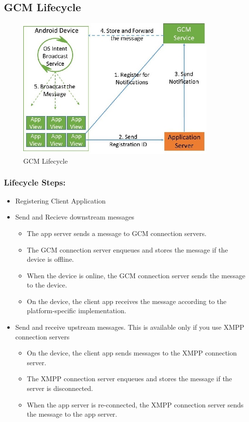 \subsection{GCM Lifecycle}
\begin{figure}[h]
\centering
\includegraphics[width=10cm]{images/Steps.jpg}
\caption{\label{fig:arch}GCM Lifecycle}
\end{figure} 
\subsubsection{Lifecycle Steps: }
\begin{itemize}
	\item Registering Client Application
	\item Send and Recieve downstream messages
		\begin{itemize}
			\item The app server sends a message to GCM connection servers.
			\item The GCM connection server enqueues and stores the message if the device is offline.
			\item When the device is online, the GCM connection server sends the message to the device.
			\item On the device, the client app receives the message according to the platform-specific implementation.
		\end{itemize}
	\item Send and receive upstream messages. This is available only if you use XMPP connection servers
		\begin{itemize}
			\item On the device, the client app sends messages to the XMPP connection server.
			\item The XMPP connection server enqueues and stores the message if the server is disconnected.
			\item When the app server is re-connected, the XMPP connection server sends the message to the app server.
		\end{itemize}
\end{itemize}
